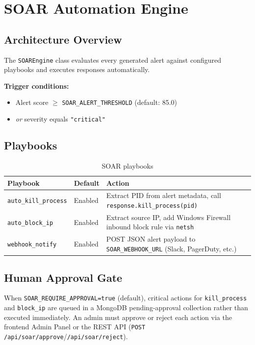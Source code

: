 \documentclass[12pt,a4paper]{article}
\begin{document}
\section{SOAR Automation Engine}

\subsection{Architecture Overview}

The \texttt{SOAREngine} class evaluates every generated alert against configured
playbooks and executes responses automatically.

\textbf{Trigger conditions:}
\begin{itemize}[noitemsep]
    \item Alert score $\geq$ \texttt{SOAR\_ALERT\_THRESHOLD} (default: 85.0)
    \item \emph{or} severity equals \texttt{"critical"}
\end{itemize}

\subsection{Playbooks}

\begin{table}[H]
\centering
\begin{tabularx}{\linewidth}{llX}
\toprule
\textbf{Playbook} & \textbf{Default} & \textbf{Action} \\
\midrule
\texttt{auto\_kill\_process} & Enabled & Extract PID from alert metadata, call \texttt{response.kill\_process(pid)} \\
\texttt{auto\_block\_ip} & Enabled & Extract source IP, add Windows Firewall inbound block rule via \texttt{netsh} \\
\texttt{webhook\_notify} & Enabled & POST JSON alert payload to \texttt{SOAR\_WEBHOOK\_URL} (Slack, PagerDuty, etc.) \\
\bottomrule
\end{tabularx}
\caption{SOAR playbooks}
\end{table}

\subsection{Human Approval Gate}

When \texttt{SOAR\_REQUIRE\_APPROVAL=true} (default), critical actions for
\texttt{kill\_process} and \texttt{block\_ip} are queued in a MongoDB pending-approval
collection rather than executed immediately. An admin must approve or reject each
action via the frontend Admin Panel or the REST API
(\texttt{POST /api/soar/approve}/\texttt{/api/soar/reject}).
\end{document}
